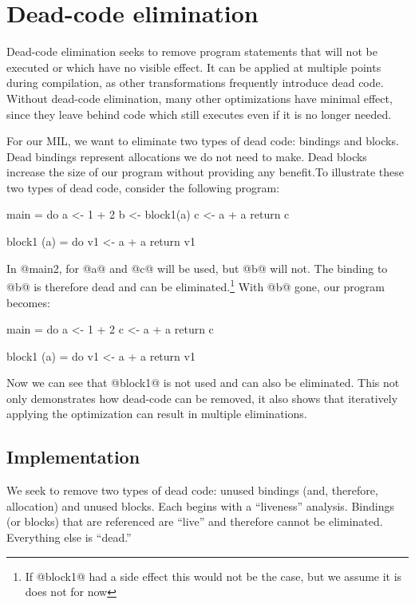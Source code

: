 \documentclass[12pt]{report}
\begin{document}


\chapter{Dead-code elimination}

Dead-code elimination seeks to remove program statements that will not
be executed or which have no visible effect. It can be applied at
multiple points during compilation, as other transformations
frequently introduce dead code. Without dead-code elimination, many
other optimizations have minimal effect, since they leave behind code
which still executes even if it is no longer needed.

For our MIL, we want to eliminate two types of dead code: bindings and
blocks. Dead bindings represent allocations we do not need to
make. Dead blocks increase the size of our program without providing
any benefit.To illustrate these two types of dead code, consider
the following program:

\begin{code}
main = do
  a <- 1 + 2
  b <- block1(a)
  c <- a + a
  return c

block1 (a) = do
  v1 <- a + a
  return v1
\end{code}

In @main2, for @a@ and @c@ will be used, but @b@ will
not. The binding to @b@ is therefore dead and can be eliminated.\footnote{If @block1@ had a
side effect this would not be the case, but we assume it is does not for now} With
@b@ gone, our program becomes:

\begin{code}
main = do
  a <- 1 + 2
  c <- a + a
  return c

block1 (a) = do
  v1 <- a + a
  return v1
\end{code}

Now we can see that @block1@ is not used and can also be
eliminated. This not only demonstrates how dead-code can be removed,
it also shows that iteratively applying the optimization can result in
multiple eliminations.

\section{Implementation}
We seek to remove two types of dead code: unused bindings (and,
therefore, allocation) and unused blocks. Each begins with a
``liveness'' analysis. Bindings (or blocks) that are referenced are ``live''
and therefore cannot be eliminated. Everything else is ``dead.''
\end{document}
